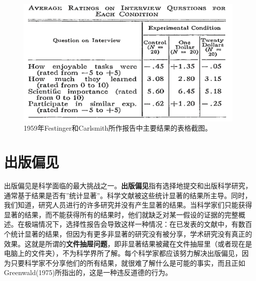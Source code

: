 \documentclass[
  letterpaper,
  DIV=11,
  numbers=noendperiod]{scrreprt}
\begin{document}
\begin{figure}

{\centering \includegraphics[width=1\textwidth,height=\textheight]{images/festinger_carlsmith.png}

}

\caption{\label{fig-festinger}1959年Festinger和Carlsmith所作报告中主要结果的表格截图。}

\end{figure}

\hypertarget{publicationbias}{%
\section{出版偏见}\label{publicationbias}}

出版偏见是科学面临的最大挑战之一。\textbf{出版偏见}指有选择地提交和出版科学研究，通常基于结果是否有''统计显著''。科学文献被这些统计显著的结果所主导。同时，我们知道，研究人员进行的许多研究并没有产生显著的结果。当科学家们只能获得显著的结果，而不能获得所有的结果时，他们就缺乏对某一假设的证据的完整概述。在极端情况下，选择性报告会导致这样一种情况：在已发表的文献中，有数百个统计显著的结果，但因为有更多非显著的研究没有被分享，学术研究没有真正的效果。这就是所谓的\textbf{文件抽屉问题}，即非显著结果被藏在文件抽屉里（或者现在是电脑上的文件夹），不为科学界所了解。每个科学家都应该努力解决出版偏见，因为只要科学家不分享他们的所有结果，就很难了解什么是可能的事实，而且正如Greenwald(1975)所指出的，这是一种违反道德的行为。
\end{document}
